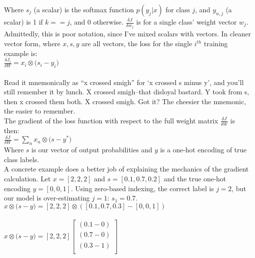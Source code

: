 \documentclass{article}
\begin{document}
Where $s_{j}$ (a scalar) is the softmax function $p(y_{j}|x)$ for class $j$, and $y_{n,j}$ (a scalar) is 1 if $k == j$, and 0 otherwise. $\frac{\delta J}{\delta w_{j}}$ is for a single class' weight vector $w_{j}$. Admittedly, this is poor notation, since I've mixed scalars with vectors. In cleaner vector form, where $x, s, y$ are all vectors, the loss for the single $i^{th}$ training example is: \\

$\frac{\delta J_{i}}{\delta W} = x_{i} \otimes \big(s_{i} - y_{i}\big) $ \\ \\

Read it mnemonically as ``x crossed smigh'' for `x crossed s minus y', and you'll still remember it by lunch. X crossed smigh--that disloyal bastard. Y took from s, then x crossed them both. X crossed smigh. Got it? The cheesier the mnemonic, the easier to remember. \\

The gradient of the loss function with respect to the full weight matrix $\frac{\delta J}{\delta W}$ is then: \\

$\boxed{ \frac{\delta J}{\delta W} = \sum_{n} x_{n} \otimes \big(s - y^{*}\big) }$ \\

Where $s$ is our vector of output probabilities and $y$ is a one-hot encoding of true class labels. \\



A concrete example does a better job of explaining the mechanics of the gradient calculation. Let $x = [2,2,2]$ and $s = [0.1, 0.7, 0.2]$ and the true one-hot encoding $y = [0,0,1]$. Using zero-based indexing, the correct label is $j=2$, but our model is over-estimating $j=1$: $s_{1} = 0.7$. \\

$x \otimes \big(s - y\big) = [2,2,2] \otimes ([0.1, 0.7, 0.3] - [0, 0, 1])$ \\ \\

$x \otimes \big(s - y\big) = [2,2,2]
\begin{bmatrix} (0.1 - 0) \\
         (0.7 - 0) \\
         (0.3 - 1) \\
         \end{bmatrix}
$ \\
\end{document}
